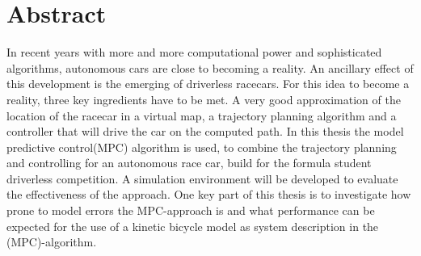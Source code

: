 \chapter*{Abstract}
In recent years with more and more computational power and sophisticated algorithms, autonomous cars are close to becoming a reality. An ancillary effect of this development is the emerging of driverless racecars. For this idea to become a reality, three key ingredients have to be met. A very good approximation of the location of the racecar in a virtual map, a trajectory planning algorithm and a controller that will drive the car on the computed path. In this thesis the model predictive control(MPC) algorithm is used, to combine the trajectory planning and controlling for an autonomous race car, build for the formula student driverless competition. A simulation environment will be developed to evaluate the effectiveness of the approach. One key part of this thesis is to investigate how prone to model errors the MPC-approach is and what performance can be expected for the use of a kinetic bicycle model as system description in the (MPC)-algorithm.